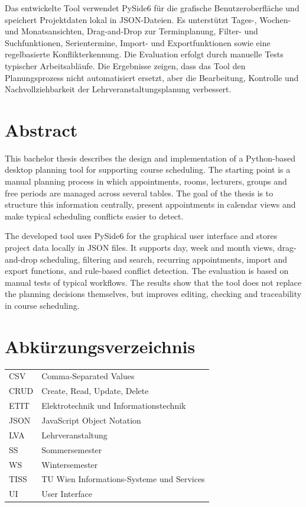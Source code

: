 \documentclass[12pt,a4paper]{article}
\begin{document}
Das entwickelte Tool verwendet PySide6 für die grafische Benutzeroberfläche und speichert Projektdaten lokal in JSON-Dateien. Es unterstützt Tages-, Wochen- und Monatsansichten, Drag-and-Drop zur Terminplanung, Filter- und Suchfunktionen, Serientermine, Import- und Exportfunktionen sowie eine regelbasierte Konflikterkennung. Die Evaluation erfolgt durch manuelle Tests typischer Arbeitsabläufe. Die Ergebnisse zeigen, dass das Tool den Planungsprozess nicht automatisiert ersetzt, aber die Bearbeitung, Kontrolle und Nachvollziehbarkeit der Lehrveranstaltungsplanung verbessert.

\section*{Abstract}

This bachelor thesis describes the design and implementation of a Python-based desktop planning tool for supporting course scheduling. The starting point is a manual planning process in which appointments, rooms, lecturers, groups and free periods are managed across several tables. The goal of the thesis is to structure this information centrally, present appointments in calendar views and make typical scheduling conflicts easier to detect.

The developed tool uses PySide6 for the graphical user interface and stores project data locally in JSON files. It supports day, week and month views, drag-and-drop scheduling, filtering and search, recurring appointments, import and export functions, and rule-based conflict detection. The evaluation is based on manual tests of typical workflows. The results show that the tool does not replace the planning decisions themselves, but improves editing, checking and traceability in course scheduling.
\newpage

\tableofcontents
\newpage

{}
\listoffigures
\newpage

{}
\listoftables
\newpage

\section*{Abkürzungsverzeichnis}

\begin{tabular}{ll}
CSV & Comma-Separated Values \\
CRUD & Create, Read, Update, Delete \\
ETIT & Elektrotechnik und Informationstechnik \\
JSON & JavaScript Object Notation \\
LVA & Lehrveranstaltung \\
SS & Sommersemester \\
WS & Wintersemester \\
TISS & TU Wien Informations-Systeme und Services \\
UI & User Interface \\
\end{tabular}
\end{document}
